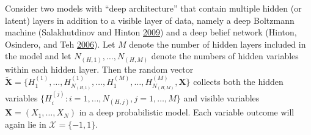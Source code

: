 \documentclass[12pt]{article}
\theoremstyle{definition}
\begin{document}
Consider two models with ``deep architecture'' that contain multiple
hidden (or latent) layers in addition to a visible layer of data, namely
a deep Boltzmann machine (Salakhutdinov and Hinton
\protect\hyperlink{ref-salakhutdinov2009deep}{2009}) and a deep belief
network (Hinton, Osindero, and Teh
\protect\hyperlink{ref-hinton2006fast}{2006}). Let \(M\) denote the
number of hidden layers included in the model and let
\(N_{(H,1)}, \dots, N_{(H,M)}\) denote the numbers of hidden variables
within each hidden layer. Then the random vector
\(\tilde{\boldsymbol X} = \{H^{(1)}_1, \dots, H^{(1)}_{N_{(H,1)}}, \dots, H^{(M)}_1, \dots, H^{(M)}_{N_{(H,M)}}, \boldsymbol X\}\)
collects both the hidden variables
\(\{ H_{i}^{(j)} : i=1,\ldots, N_{(H,j)}, j=1,\ldots,M\}\) and visible
variables \(\boldsymbol X =(X_1,\ldots,X_N)\) in a deep probabilistic
model. Each variable outcome will again lie in
\(\mathcal{X} = \{-1,1\}\).\\
\end{document}
